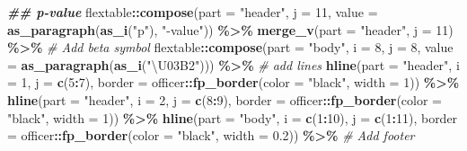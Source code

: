 \documentclass[
]{article}
\newenvironment{Shaded}{\begin{snugshade}}{\end{snugshade}}
\newcommand{\AttributeTok}[1]{\textcolor[rgb]{0.13,0.29,0.53}{#1}}
\newcommand{\CommentTok}[1]{\textcolor[rgb]{0.56,0.35,0.01}{\textit{#1}}}
\newcommand{\DecValTok}[1]{\textcolor[rgb]{0.00,0.00,0.81}{#1}}
\newcommand{\DocumentationTok}[1]{\textcolor[rgb]{0.56,0.35,0.01}{\textbf{\textit{#1}}}}
\newcommand{\FloatTok}[1]{\textcolor[rgb]{0.00,0.00,0.81}{#1}}
\newcommand{\FunctionTok}[1]{\textcolor[rgb]{0.13,0.29,0.53}{\textbf{#1}}}
\newcommand{\NormalTok}[1]{#1}
\newcommand{\SpecialCharTok}[1]{\textcolor[rgb]{0.81,0.36,0.00}{\textbf{#1}}}
\newcommand{\StringTok}[1]{\textcolor[rgb]{0.31,0.60,0.02}{#1}}
\begin{document}
\begin{landscape}
\begin{Shaded}
\begin{Highlighting}[]
  \DocumentationTok{\#\# p{-}value }
\NormalTok{  flextable}\SpecialCharTok{::}\FunctionTok{compose}\NormalTok{(}\AttributeTok{part =} \StringTok{"header"}\NormalTok{, }\AttributeTok{j =} \DecValTok{11}\NormalTok{, }\AttributeTok{value =} \FunctionTok{as\_paragraph}\NormalTok{(}\FunctionTok{as\_i}\NormalTok{(}\StringTok{"p"}\NormalTok{), }\StringTok{"{-}value"}\NormalTok{)) }\SpecialCharTok{\%\textgreater{}\%} 
  \FunctionTok{merge\_v}\NormalTok{(}\AttributeTok{part =} \StringTok{"header"}\NormalTok{, }\AttributeTok{j =} \DecValTok{11}\NormalTok{) }\SpecialCharTok{\%\textgreater{}\%} 
  \CommentTok{\# Add beta symbol}
\NormalTok{  flextable}\SpecialCharTok{::}\FunctionTok{compose}\NormalTok{(}\AttributeTok{part =} \StringTok{"body"}\NormalTok{, }\AttributeTok{i =} \DecValTok{8}\NormalTok{, }\AttributeTok{j =} \DecValTok{8}\NormalTok{, }\AttributeTok{value =} \FunctionTok{as\_paragraph}\NormalTok{(}\FunctionTok{as\_i}\NormalTok{(}\StringTok{"\textbackslash{}U03B2"}\NormalTok{))) }\SpecialCharTok{\%\textgreater{}\%} 
  \CommentTok{\# add lines}
  \FunctionTok{hline}\NormalTok{(}\AttributeTok{part =} \StringTok{"header"}\NormalTok{, }\AttributeTok{i =} \DecValTok{1}\NormalTok{, }\AttributeTok{j =} \FunctionTok{c}\NormalTok{(}\DecValTok{5}\SpecialCharTok{:}\DecValTok{7}\NormalTok{), }\AttributeTok{border =}\NormalTok{ officer}\SpecialCharTok{::}\FunctionTok{fp\_border}\NormalTok{(}\AttributeTok{color =} \StringTok{"black"}\NormalTok{, }\AttributeTok{width =} \DecValTok{1}\NormalTok{)) }\SpecialCharTok{\%\textgreater{}\%} 
  \FunctionTok{hline}\NormalTok{(}\AttributeTok{part =} \StringTok{"header"}\NormalTok{, }\AttributeTok{i =} \DecValTok{2}\NormalTok{, }\AttributeTok{j =} \FunctionTok{c}\NormalTok{(}\DecValTok{8}\SpecialCharTok{:}\DecValTok{9}\NormalTok{), }\AttributeTok{border =}\NormalTok{ officer}\SpecialCharTok{::}\FunctionTok{fp\_border}\NormalTok{(}\AttributeTok{color =} \StringTok{"black"}\NormalTok{, }\AttributeTok{width =} \DecValTok{1}\NormalTok{)) }\SpecialCharTok{\%\textgreater{}\%} 
  \FunctionTok{hline}\NormalTok{(}\AttributeTok{part =} \StringTok{"body"}\NormalTok{, }\AttributeTok{i =} \FunctionTok{c}\NormalTok{(}\DecValTok{1}\SpecialCharTok{:}\DecValTok{10}\NormalTok{), }\AttributeTok{j =} \FunctionTok{c}\NormalTok{(}\DecValTok{1}\SpecialCharTok{:}\DecValTok{11}\NormalTok{), }\AttributeTok{border =}\NormalTok{ officer}\SpecialCharTok{::}\FunctionTok{fp\_border}\NormalTok{(}\AttributeTok{color =} \StringTok{"black"}\NormalTok{, }\AttributeTok{width =} \FloatTok{0.2}\NormalTok{)) }\SpecialCharTok{\%\textgreater{}\%} 
  \CommentTok{\# Add footer}

\end{Highlighting}
\end{Shaded}
\end{landscape}
\end{document}
